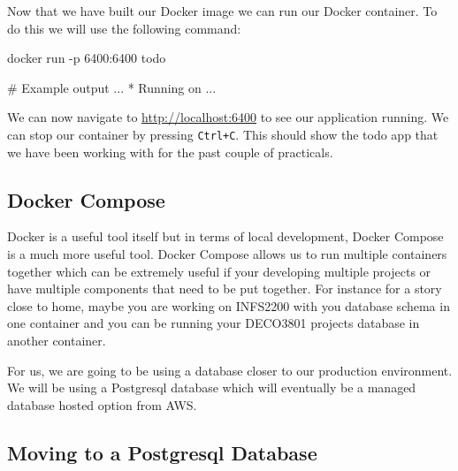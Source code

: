 \documentclass{csse4400}
\begin{document}
Now that we have built our Docker image we can run our Docker container. To do this we will use the following command:

\begin{code}[language=bash,numbers=none]{}
  docker run -p 6400:6400 todo

  # Example output
  ...
  * Running on ...
\end{code}

We can now navigate to \url{http://localhost:6400} to see our application running. We can stop our container by pressing \texttt{Ctrl+C}. This should show the todo app that we have been working with for the past couple of practicals.



\subsection{Docker Compose}

Docker is a useful tool itself but in terms of local development, Docker Compose is a much more useful tool. Docker Compose allows us to run multiple containers together which can be extremely useful if your developing multiple projects or have multiple components that need to be put together. For instance for a story close to home, maybe you are working on INFS2200 with you database schema in one container and you can be running your DECO3801 projects database in another container. 

For us, we are going to be using a database closer to our production environment. We will be using a Postgresql database which will eventually be a managed database hosted option from AWS.

\subsection{Moving to a Postgresql Database}
\end{document}
